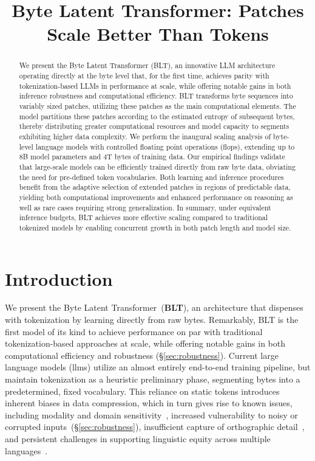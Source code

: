 \title{Byte Latent Transformer: Patches Scale Better Than Tokens}

\begin{abstract}
We present the Byte Latent Transformer (\textsc{BLT}), an innovative LLM architecture operating directly at the byte level that, for the first time, achieves parity with tokenization-based LLMs in performance at scale, while offering notable gains in both inference robustness and computational efficiency. \textsc{BLT} transforms byte sequences into variably sized patches, utilizing these patches as the main computational elements. The model partitions these patches according to the estimated entropy of subsequent bytes, thereby distributing greater computational resources and model capacity to segments exhibiting higher data complexity. We perform the inaugural scaling analysis of byte-level language models with controlled floating point operations (flops), extending up to 8B model parameters and 4T bytes of training data. Our empirical findings validate that large-scale models can be efficiently trained directly from raw byte data, obviating the need for pre-defined token vocabularies. Both learning and inference procedures benefit from the adaptive selection of extended patches in regions of predictable data, yielding both computational improvements and enhanced performance on reasoning as well as rare cases requiring strong generalization. In summary, under equivalent inference budgets, \textsc{BLT} achieves more effective scaling compared to traditional tokenized models by enabling concurrent growth in both patch length and model size.
\end{abstract}

\section{Introduction}
\label{section:intro}

We present the Byte Latent Transformer~(\textbf{BLT}), an architecture that dispenses with tokenization by learning directly from raw bytes. Remarkably, BLT is the first model of its kind to achieve performance on par with traditional tokenization-based approaches at scale, while offering notable gains in both computational efficiency and robustness (\S\ref{sec:robustness}). Current large language models (llms) utilize an almost entirely end-to-end training pipeline, but maintain tokenization as a heuristic preliminary phase, segmenting bytes into a predetermined, fixed vocabulary. This reliance on static tokens introduces inherent biases in data compression, which in turn gives rise to known issues, including modality and domain sensitivity~\citep{dagangetting}, increased vulnerability to noisy or corrupted inputs~(\S\ref{sec:robustness}), insufficient capture of orthographic detail~\citep{edman2024cute}, and persistent challenges in supporting linguistic equity across multiple languages~\citep{liang2023xlm,petrov2024language,limisiewicz2024myte}.

